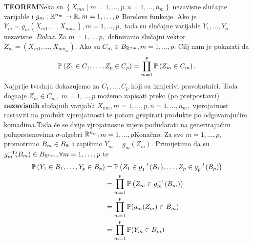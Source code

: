 \documentclass{article}
\begin{document}
\textbf{TEOREM}\newline Neka su \(\left\{X_{mn}\mid m=1,\ldots,p,n=1,\ldots,n_m\right\}\) nezavisne slučajne varijable i \(g_m:\Bbb R^{n_m}\to\Bbb R,m=1,\ldots,p\) Borelove funkcije. Ako je \(Y_m=g_m\left(X_{m1},\ldots,X_{mn_m}\right),m=1,\ldots,p,\) tada su slučajne varijable \(Y_1,\ldots,Y_p\) nezavisne.\newline\newline
\textit{Dokaz.}\newline
Za \(m=1,\ldots,p,\) definiramo slučajni vektor \(Z_m=(X_{m1},\ldots,X_{mn_m}).\) Ako su \(C_m\in B_{\Bbb R^{n_m}},\)\newline \(m=1,\ldots,p.\) Cilj nam je pokazati da \[\Bbb P\left(Z_1\in C_1,\ldots,Z_p\in C_p\right)=\prod_{m=1}^p\Bbb P\left(Z_m\in C_m\right).\] Najprije tvrdnju dokazujemo za \(C_1,\ldots,C_p\) koji su izmjerivi pravokutnici. Tada doga\dj{}aje \(Z_m\in C_m,\) \newline\(m=1,\ldots,p\) možemo zapisati preko (po pretpostavci) \textbf{nezavisnih} slučajnih varijabli \(X_{nm},m=1,\ldots,p,\)\newline \(n=1,\ldots,n_m,\) vjerojatnost rastaviti na produkt vjerojatnosti te potom grupirati produkte po odgovarajućim komadima.\newline Tada će se dvije vjrojatnosne mjere podudarati na generirajućim poluprstenovima \(\sigma\)-algebri \(\Bbb R^{n_m},\)\newline\(m=1,\ldots,p\)\newline Konačno:  Za sve \(m=1,\ldots,p,\) promotrimo \(B_m\in B_{\Bbb R}\) i zapišimo \(Y_m=g_m(Z_m).\) Primijetimo da su \(g_m^{-1}(B_m)\in B_{\Bbb R^{n_m}},\forall m=1,\ldots,p\) te \[\begin{aligned}\Bbb P\left(Y_1\in B_1,\ldots,Y_p\in B_p\right)&=\Bbb P\left(Z_1\in g_1^{-1}(B_1),\ldots, Z_p\in g_p^{-1}(B_p)\right)\\&=\prod_{m=1}^p\Bbb P\left(Z_m\in g_m^{-1}(B_m)\right)\\&=\prod_{m=1}^p\Bbb P(g_m(Z_m)\in B_m)\\&=\prod_{m=1}^p\Bbb P(Y_m\in B_m)\end{aligned}\] 
\end{document}
